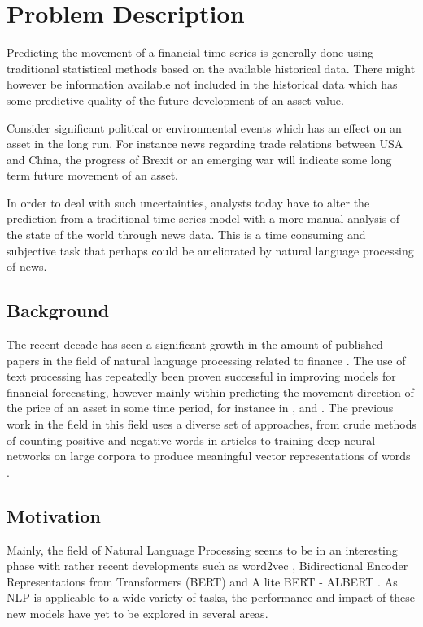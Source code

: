 \chapter{Problem Description}

Predicting the movement of a financial time series is generally done using traditional statistical methods based on the available historical data. There might however be information available not included in the historical data which has some predictive quality of the future development of an asset value. 

Consider significant political or environmental events which has an effect on an asset in the long run. For instance news regarding trade relations between USA and China, the progress of Brexit or an emerging war will indicate some long term future movement of an asset. 

In order to deal with such uncertainties, analysts today have to alter the prediction from a traditional time series model with a more manual analysis of the state of the world through news data. This is a time consuming and subjective task that perhaps could be ameliorated by natural language processing of news.

\section{Background}

The recent decade has seen a significant growth in the amount of published papers in the field of natural language processing related to finance \citep{xing}. The use of text processing has repeatedly been proven successful in improving models for financial forecasting, however mainly within predicting the movement direction of the price of an asset in some time period, for instance in \citet{li2014news}, \citet{heston2017news} and \citet{othan}. The previous work in the field in this field uses a diverse set of approaches, from crude methods of counting positive and negative words in articles to training deep neural networks on large corpora to produce meaningful vector representations of words \citep{arorausing}. 


\section{Motivation}

Mainly, the field of Natural Language Processing seems to be in an interesting phase with rather recent developments such as word2vec \citep{mikolov2013efficient}, Bidirectional Encoder Representations from Transformers (BERT) \citep{devlin2018bert} and A lite BERT - ALBERT \citep{lan2019albert}. As NLP is applicable to a wide variety of tasks, the performance and impact of these new models have yet to be explored in several areas. 

